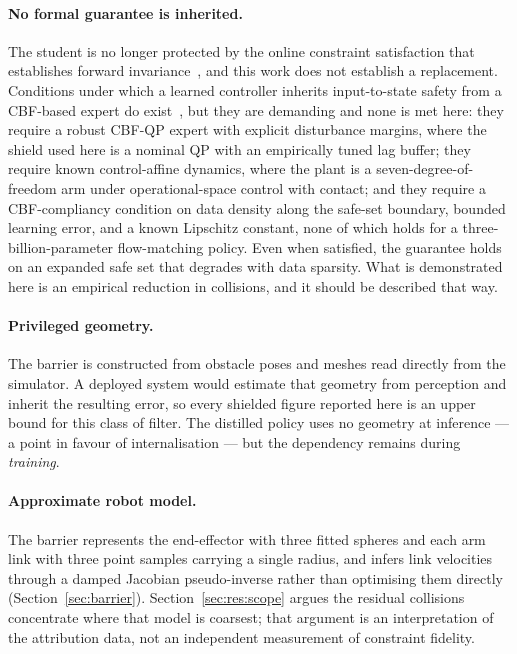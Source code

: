 \documentclass[a4paper,11pt]{report}
\begin{document}
\paragraph{No formal guarantee is inherited.}
The student is no longer protected by the online constraint satisfaction that establishes forward
invariance~\cite{ames2017cbf}, and this work does not establish a replacement. Conditions under
which a learned controller inherits input-to-state safety from a CBF-based expert do
exist~\cite{cosner2022il_cbf}, but they are demanding and none is met here: they require a robust
CBF-QP expert with explicit disturbance margins, where the shield used here is a nominal QP with an
empirically tuned lag buffer; they require known control-affine dynamics, where the plant is a
seven-degree-of-freedom arm under operational-space control with contact; and they require a
CBF-compliancy condition on data density along the safe-set boundary, bounded learning error, and a
known Lipschitz constant, none of which holds for a three-billion-parameter flow-matching policy.
Even when satisfied, the guarantee holds on an expanded safe set that degrades with data sparsity.
What is demonstrated here is an empirical reduction in collisions, and it should be described that
way.

\paragraph{Privileged geometry.}
The barrier is constructed from obstacle poses and meshes read directly from the simulator. A
deployed system would estimate that geometry from perception and inherit the resulting error, so
every shielded figure reported here is an upper bound for this class of filter. The distilled
policy uses no geometry at inference --- a point in favour of internalisation --- but the
dependency remains during \emph{training}.

\paragraph{Approximate robot model.}
The barrier represents the end-effector with three fitted spheres and each arm link with three
point samples carrying a single radius, and infers link velocities through a damped Jacobian
pseudo-inverse rather than optimising them directly (Section~\ref{sec:barrier}).
Section~\ref{sec:res:scope} argues the residual collisions concentrate where that model is
coarsest; that argument is an interpretation of the attribution data, not an independent
measurement of constraint fidelity.
\end{document}
